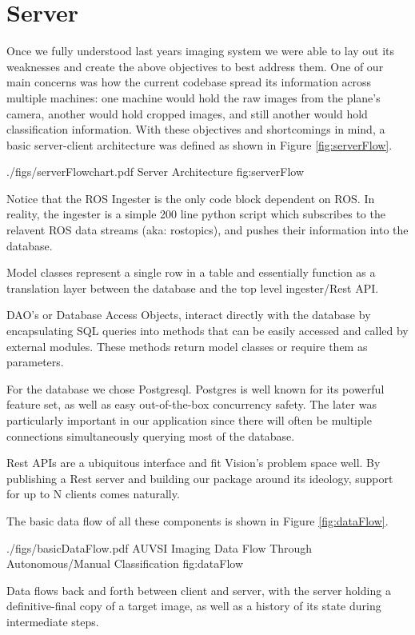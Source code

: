 \documentclass[]{auvsi_doc}
\begin{document}
\section{Server}

Once we fully understood last years imaging system we were able to lay out its weaknesses
and create the above objectives to best address them. One of our main concerns was how the 
current codebase spread its information across multiple machines: one machine would hold 
the raw images from the plane's camera, another would hold cropped images, and still another
would hold classification information. With these objectives and shortcomings in mind, a 
basic server-client architecture was defined as shown in Figure \ref{fig:serverFlow}.

\AUVSIFigure
{./figs/serverFlowchart.pdf}
{\textwidth}
{Server Architecture}
{fig:serverFlow}

Notice that the ROS Ingester is the only code block dependent on ROS. In reality, the
ingester is a simple 200 line python script which subscribes to the relavent ROS data
streams (aka: rostopics), and pushes their information into the database.

Model classes represent a single row in a table and essentially function as a translation
layer between the database and the top level ingester/Rest API. 

DAO's or Database Access Objects, interact directly with the database by encapsulating
SQL queries into methods that can be easily accessed and called by external modules.
These methods return model classes or require them as parameters.

For the database we chose Postgresql. Postgres is well known for its powerful
feature set, as well as easy out-of-the-box concurrency safety. The later was particularly
important in our application since there will often be multiple connections simultaneously 
querying most of the database.

Rest APIs are a ubiquitous interface and fit Vision's problem space well. By publishing a
Rest server and building our package around its ideology, support for up to N clients comes
naturally. 

The basic data flow of all these components is shown in Figure \ref{fig:dataFlow}.

\AUVSIFigure
{./figs/basicDataFlow.pdf}
{\textwidth}
{AUVSI Imaging Data Flow Through Autonomous/Manual Classification}
{fig:dataFlow}

Data flows back and forth between client and server, with the server holding a definitive-final
copy of a target image, as well as a history of its state during intermediate steps.
\end{document}
